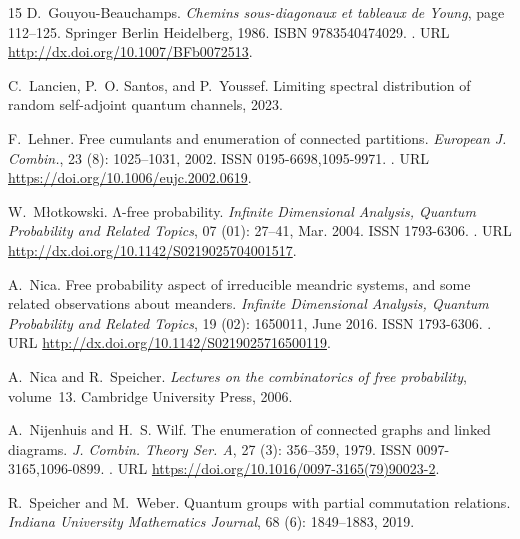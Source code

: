 \documentclass[12pt,reqno]{amsart}
\theoremstyle{plain}
\newcommand{\1}{\mathbf{1}}
\begin{document}
\begin{thebibliography}{15}
D.~Gouyou-Beauchamps.
\newblock \emph{Chemins sous-diagonaux et tableaux de Young}, page 112–125.
\newblock Springer Berlin Heidelberg, 1986.
\newblock ISBN 9783540474029.
\newblock {}.
\newblock URL \url{http://dx.doi.org/10.1007/BFb0072513}.

C.~Lancien, P.~O. Santos, and P.~Youssef.
\newblock Limiting spectral distribution of random self-adjoint quantum
  channels, 2023.

F.~Lehner.
\newblock Free cumulants and enumeration of connected partitions.
\newblock \emph{European J. Combin.}, 23 (8): 1025--1031,
  2002.
\newblock ISSN 0195-6698,1095-9971.
\newblock {}.
\newblock URL \url{https://doi.org/10.1006/eujc.2002.0619}.

W.~M\l{}otkowski.
\newblock Λ-free probability.
\newblock \emph{Infinite Dimensional Analysis, Quantum Probability and Related
  Topics}, 07 (01): 27–41, Mar. 2004.
\newblock ISSN 1793-6306.
\newblock {}.
\newblock URL \url{http://dx.doi.org/10.1142/S0219025704001517}.

A.~Nica.
\newblock Free probability aspect of irreducible meandric systems, and some
  related observations about meanders.
\newblock \emph{Infinite Dimensional Analysis, Quantum Probability and Related
  Topics}, 19 (02): 1650011, June 2016.
\newblock ISSN 1793-6306.
\newblock {}.
\newblock URL \url{http://dx.doi.org/10.1142/S0219025716500119}.

A.~Nica and R.~Speicher.
\newblock \emph{Lectures on the combinatorics of free probability}, volume~13.
\newblock Cambridge University Press, 2006.

A.~Nijenhuis and H.~S. Wilf.
\newblock The enumeration of connected graphs and linked diagrams.
\newblock \emph{J. Combin. Theory Ser. A}, 27 (3): 356--359,
  1979.
\newblock ISSN 0097-3165,1096-0899.
\newblock {}.
\newblock URL \url{https://doi.org/10.1016/0097-3165(79)90023-2}.

R.~Speicher and M.~Weber.
\newblock Quantum groups with partial commutation relations.
\newblock \emph{Indiana University Mathematics Journal}, 68
  (6): 1849--1883, 2019.


\end{thebibliography}
\end{document}
